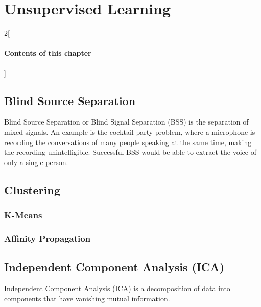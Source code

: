 \chapter{Unsupervised Learning}

\begin{multicols}{2}[\subsubsection*{Contents of this chapter}]
\end{multicols}

\section{Blind Source Separation}
Blind Source Separation or Blind Signal Separation (BSS) is the separation of mixed signals. An example is the cocktail party problem, where a microphone is recording the conversations of many people speaking at the same time, making the recording unintelligible. Successful BSS would be able to extract the voice of only a single person.  

\section{Clustering}

\subsection{K-Means}
\subsection{Affinity Propagation}

\section{Independent Component Analysis (ICA)}
Independent Component Analysis (ICA) is a decomposition of data into components that have vanishing mutual information. 








\chapauthor{}	